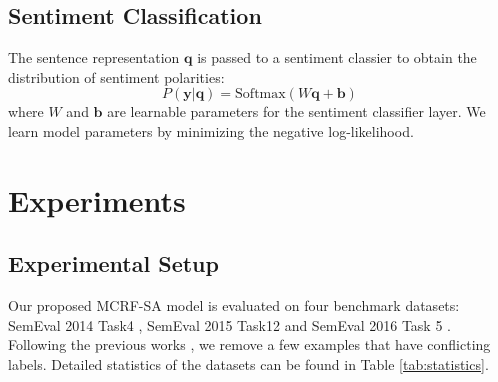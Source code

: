 \documentclass[11pt,a4paper]{article}
\begin{document}
\subsection{Sentiment Classification}


The sentence representation $\mathbf{q}$ is passed to a sentiment classier to obtain the distribution of sentiment polarities:
\begin{equation}
    \label{classifier}
    P(\mathbf{y} | \mathbf{q}) =  \mathrm{Softmax}(W\mathbf{q}  + \mathbf{b})
\end{equation}
where $W $ and $\mathbf{b}$ are learnable parameters for the sentiment classifier layer. We learn model parameters by minimizing the negative log-likelihood.





\section{Experiments}
\subsection{Experimental Setup}
Our proposed MCRF-SA model  is evaluated on four benchmark datasets: SemEval 2014 Task4 \cite{pontiki-EtAl:2014:SemEval}, SemEval 2015 Task12 \cite{pontiki-etal-2015-semeval} and SemEval 2016 Task 5 \cite{pontiki-etal-2016-semeval}. 
Following the previous works \cite{Tang2016AspectLS, chen-EtAl:2017:EMNLP20171, bailin-lu:2018:AAAI2018, he-etal-2018-effective}, we remove a few examples that have conflicting labels. Detailed statistics of the datasets can be found in Table \ref{tab:statistics}. 
\end{document}
